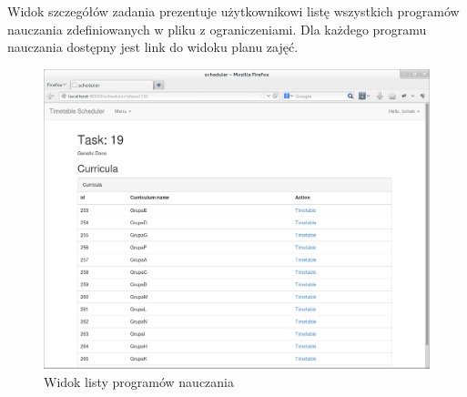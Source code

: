\par Widok szczegółów zadania prezentuje użytkownikowi listę wszystkich programów nauczania zdefiniowanych w pliku z ograniczeniami. Dla każdego programu nauczania dostępny jest link do widoku planu zajęć.
\begin{figure}[H]
\centering
\includegraphics[width=12cm]{img/guide/user6.png}
\caption{Widok listy programów nauczania}
\end{figure}

